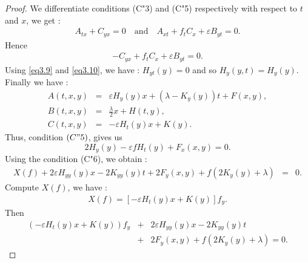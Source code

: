 \documentclass[10pt,a4paper]{amsart}
\begin{document}
\begin{proof}
We differentiate conditions (C"3) and (C"5) respectively with respect to $t$ and $x$, 
we get :
\begin{eqnarray*}
A_{tx} + C_{yx}=0 \quad \mbox{and}\quad
A_{xt} + f_{t}C_{x}+\varepsilon B_{yt} = 0.
\end{eqnarray*}
Hence
\begin{eqnarray*}
- C_{yx} + f_tC_x + \varepsilon B_{yt} = 0.
\end{eqnarray*}
Using \eqref{eq3.9} and \eqref{eq3.10}, we have : $ H_{yt}(y)=0$ and
so $H_{y}(y,t) = H_{y}(y)$. Finally we have :
\begin{eqnarray*}
A(t,x,y) &=& \varepsilon H_{y}(y)x + \left( \lambda - K_{y}(y)\right) t + F(x,y),\\
B(t,x,y) &=& \frac{\lambda}{2}x + H(t,y),\\
C(t,x,y) &=& - \varepsilon H_{t}(y)x+K(y).
\end{eqnarray*}
Thus, condition $(C"5)$, gives us
\begin{equation*}
2H_y(y) - \varepsilon f H_t(y) + F_x(x,y)=0.
\end{equation*}
Using the condition (C"6), we obtain :
\begin{eqnarray*}
X(f) + 2\varepsilon H_{yy}(y)x - 2K_{yy}(y)t + 2F_{y}(x,y) 
+ f\left( 2K_{y}(y)+\lambda\right) &=& 0.
\end{eqnarray*}
Compute $X(f)$, we have :
\begin{eqnarray*}
X(f) = \left[ -\varepsilon H_{t}(y)x + K(y)\right] f_y. 
\end{eqnarray*}
Then
\begin{eqnarray*}
\left( -\varepsilon H_{t}(y)x + K(y)\right)f_y &+& 2\varepsilon H_{yy}(y)x 
-2K_{yy}(y)t \\
&+& 2F_{y}(x,y) + f\left( 2K_{y}(y) + \lambda\right) =0.   
	\end{eqnarray*}
\end{proof}	
\end{document}
